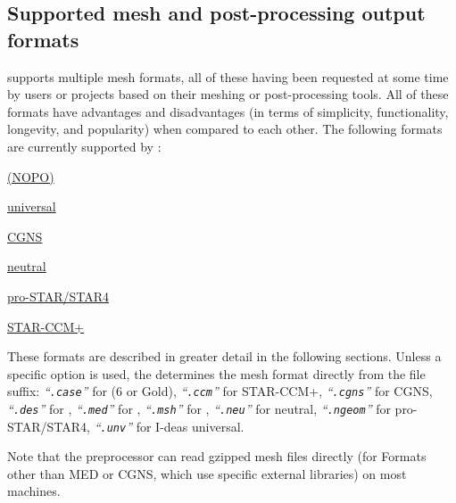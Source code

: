 {{{\smallskip \noindent

\subsection{Supported mesh and post-processing output formats
\label{sec:formats}}

\CS supports multiple mesh formats, all of these having been requested
at some time by users or projects based on their meshing or post-processing
tools. All of these formats have advantages and disadvantages (in terms
of simplicity, functionality, longevity, and popularity) when compared to
each other. The following formats are currently supported by \CS:

\begin{list}{-}{}

\item \hyperref[fmtdesc:des]{\simail (NOPO)}
\item \hyperref[fmtdesc:unv]{\ideas universal}
\item \hyperref[fmtdesc:med]{\med}
\item \hyperref[fmtdesc:cgns]{CGNS}
\item \hyperref[fmtdesc:ensight6]{}
\item \hyperref[fmtdesc:ensightg]{\ensightg}
\item \hyperref[fmtdesc:neu]{\gambit neutral}
\item \hyperref[fmtdesc:gmsh]{\gmsh}
\item \hyperref[fmtdesc:ngeom]{pro-STAR/STAR4}
\item \hyperref[fmtdesc:ccm]{STAR-CCM+}
\end{list}

These formats are described in greater detail in the following sections.
Unless a specific option is used, the \pcs determines the mesh format directly
from the file suffix: %
{\em``\texttt{.case}''} for \ensight (6 or Gold),
{\em``\texttt{.ccm}''} for STAR-CCM+,
{\em``\texttt{.cgns}''} for CGNS,
{\em``\texttt{.des}''} for \simail,
{\em``\texttt{.med}''} for \med,
{\em``\texttt{.msh}''} for \gmsh,
{\em``\texttt{.neu}''} for \gambit neutral,
{\em``\texttt{.ngeom}''} for pro-STAR/STAR4,
{\em``\texttt{.unv}''} for I-deas universal.

Note that the preprocessor can read gzipped mesh files directly (for Formats
other than MED or CGNS, which use specific external libraries) on most machines.

}}}
